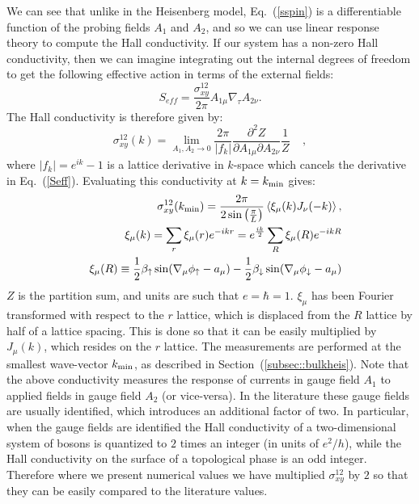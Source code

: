 \documentclass[prb,twocolumn]{revtex4-1}
\begin{document}
 We can see that unlike in the Heisenberg model, Eq.~(\ref{sspin}) is a differentiable function of the probing fields $A_1$ and $A_2$, and so we can use linear response theory to compute the Hall conductivity. If our system has a non-zero Hall conductivity, then we can imagine integrating out the internal degrees of freedom to get the following effective action in terms of the external fields:
\begin{equation}
S_{eff}=\frac{\sigma_{xy}^{12}}{2\pi} A_{1\mu}\nabla_{\tau}A_{2\nu}.
\label{Seff}
\end{equation}
The Hall conductivity is therefore given by:
\begin{equation}
\sigma_{xy}^{12}(k)=\lim_{A_1,A_2 \to 0}\frac{2\pi}{|f_k|}\frac{\partial^2 Z}{\partial A_{1\mu}\partial A_{2\nu}}\frac{1}{Z}~~~~~,
\end{equation}
where $|f_k|=e^{ik}-1$ is a lattice derivative in $k$-space which cancels the derivative in Eq.~(\ref{Seff}). Evaluating this conductivity at $k=k_{\rm min}$ gives:
\begin{eqnarray}
&&\sigma_{xy}^{12}(k_{\rm min})=\frac{2\pi}{2\sin\left(\frac{\pi}{L}\right)}\left\langle\xi_\mu(k)J_{\nu}(-k) \right\rangle,\nonumber\\
&&\xi_\mu(k)=\sum_r \xi_\mu(r)e^{-ikr}=e^{\frac{ik}{2}}\sum_R \xi_\mu(R)e^{-ikR}\\
&&\xi_\mu(R)\equiv\frac{1}{2}\beta_\uparrow\sin(\nabla_\mu\phi_\uparrow-a_\mu)-\frac{1}{2}\beta_\downarrow\sin(\nabla_\mu\phi_\downarrow-a_\mu)\nonumber
\end{eqnarray}
$Z$ is the partition sum, and units are such that $e=\hbar=1$. 
$\xi_\mu$ has been Fourier transformed with respect to the $r$ lattice, which is displaced from the $R$ lattice by half of a lattice spacing. This is done so that it can be easily multiplied by $J_\mu(k)$, which resides on the $r$ lattice. 
The measurements are performed at the smallest wave-vector $k_{\rm min}$, as described in Section~(\ref{subsec::bulkheis}). 
Note that the above conductivity measures the response of currents in gauge field $A_1$ to applied fields in gauge field $A_2$ (or vice-versa). In the literature these gauge fields are usually identified, which introduces an additional factor of two. In particular, when the gauge fields are identified the Hall conductivity of a two-dimensional system of bosons is quantized to $2$ times an integer (in units of $e^2/h$), while the Hall conductivity on the surface of a topological phase is an odd integer. Therefore where we present numerical values we have multiplied $\sigma^{12}_{xy}$ by $2$ so that they can be easily compared to the literature values.
\end{document}
